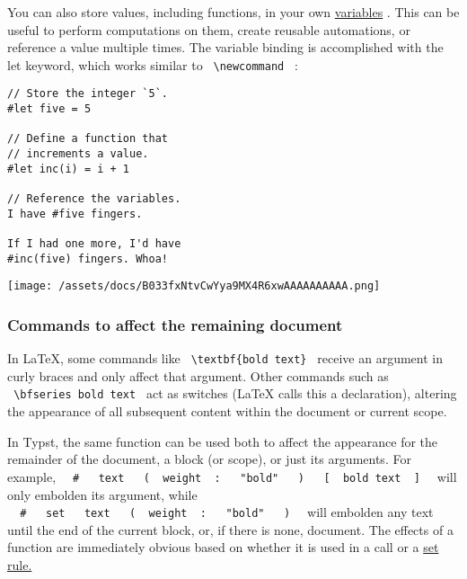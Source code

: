 You can also store values, including functions, in your own
\href{/docs/reference/scripting/\#bindings}{variables} . This can be
useful to perform computations on them, create reusable automations, or
reference a value multiple times. The variable binding is accomplished
with the let keyword, which works similar to
\texttt{\ \textbackslash{}newcommand\ } :

\begin{verbatim}
// Store the integer `5`.
#let five = 5

// Define a function that
// increments a value.
#let inc(i) = i + 1

// Reference the variables.
I have #five fingers.

If I had one more, I'd have
#inc(five) fingers. Whoa!
\end{verbatim}

\texttt{[image: /assets/docs/B033fxNtvCwYya9MX4R6xwAAAAAAAAAA.png]}

\subsubsection{Commands to affect the remaining document}\label{rules}

In LaTeX, some commands like
\texttt{\ \textbackslash{}textbf\{bold\ text\}\ } receive an argument in
curly braces and only affect that argument. Other commands such as
\texttt{\ \textbackslash{}bfseries\ bold\ text\ } act as switches (LaTeX
calls this a declaration), altering the appearance of all subsequent
content within the document or current scope.

In Typst, the same function can be used both to affect the appearance
for the remainder of the document, a block (or scope), or just its
arguments. For example,
\texttt{\ }{\texttt{\ \#\ }}\texttt{\ }{\texttt{\ text\ }}\texttt{\ }{\texttt{\ (\ }}\texttt{\ weight\ }{\texttt{\ :\ }}\texttt{\ }{\texttt{\ "bold"\ }}\texttt{\ }{\texttt{\ )\ }}\texttt{\ }{\texttt{\ {[}\ }}\texttt{\ bold\ text\ }{\texttt{\ {]}\ }}\texttt{\ }
will only embolden its argument, while
\texttt{\ }{\texttt{\ \#\ }}\texttt{\ }{\texttt{\ set\ }}\texttt{\ }{\texttt{\ text\ }}\texttt{\ }{\texttt{\ (\ }}\texttt{\ weight\ }{\texttt{\ :\ }}\texttt{\ }{\texttt{\ "bold"\ }}\texttt{\ }{\texttt{\ )\ }}\texttt{\ }
will embolden any text until the end of the current block, or, if there
is none, document. The effects of a function are immediately obvious
based on whether it is used in a call or a
\href{/docs/reference/styling/\#set-rules}{set rule.}

